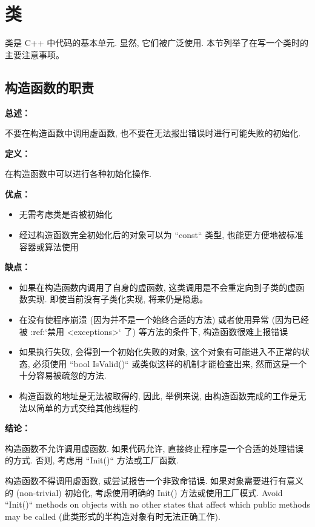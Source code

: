 \chapter{类}

类是 C++ 中代码的基本单元. 显然, 它们被广泛使用. 本节列举了在写一个类时的主要注意事项。

\section{构造函数的职责}

\textbf{总述：}

不要在构造函数中调用虚函数, 也不要在无法报出错误时进行可能失败的初始化.

\textbf{定义：}

在构造函数中可以进行各种初始化操作.

\textbf{优点：}

\begin{itemize}
  \item 无需考虑类是否被初始化
  \item 经过构造函数完全初始化后的对象可以为 ``const`` 类型, 也能更方便地被标准容器或算法使用
\end{itemize}

\textbf{缺点：}

\begin{itemize}
  \item 如果在构造函数内调用了自身的虚函数, 这类调用是不会重定向到子类的虚函数实现. 即使当前没有子类化实现, 将来仍是隐患。
  \item 在没有使程序崩溃 (因为并不是一个始终合适的方法) 或者使用异常 (因为已经被 :ref:`禁用 <exceptions>` 了) 等方法的条件下, 构造函数很难上报错误
  \item 如果执行失败, 会得到一个初始化失败的对象, 这个对象有可能进入不正常的状态, 必须使用 ``bool IsValid()`` 或类似这样的机制才能检查出来, 然而这是一个十分容易被疏忽的方法.
  \item 构造函数的地址是无法被取得的, 因此, 举例来说, 由构造函数完成的工作是无法以简单的方式交给其他线程的.
\end{itemize}

\textbf{结论：}

构造函数不允许调用虚函数. 如果代码允许, 直接终止程序是一个合适的处理错误的方式. 否则, 考虑用 ``Init()`` 方法或工厂函数.

构造函数不得调用虚函数, 或尝试报告一个非致命错误. 如果对象需要进行有意义的 (non-trivial) 初始化, 考虑使用明确的 Init() 方法或使用工厂模式. Avoid ``Init()`` methods on objects with no other states that affect which public methods may be called (此类形式的半构造对象有时无法正确工作).

